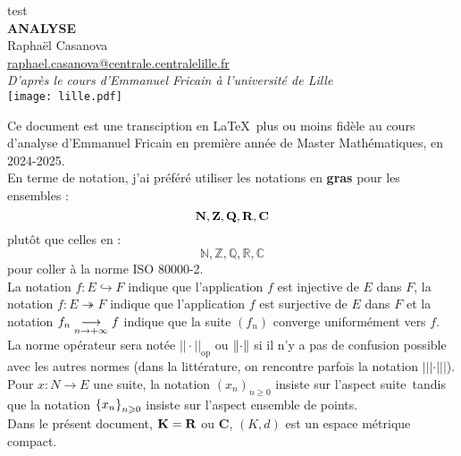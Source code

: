 \documentclass[a4paper,11pt, twoside]{article}
\title{}
\author{Raphaël Casanova}
\begin{document}
\pagestyle{empty}
\begin{center}
{\color{white} test}\\
\vspace{5cm}
{\bf \Huge {\YUGE A}NALYSE}\\[1em]
{\large
Raphaël Casanova\\
\href{mailto:raphael.casanova@centrale.centralelille.fr}{raphael.casanova@centrale.centralelille.fr}\\[2em]
\emph{D'après le cours d'Emmanuel Fricain à l'université de Lille}}\\
\vspace{10cm}
\texttt{[image: lille.pdf]}
\end{center}


\newpage


\pagestyle{pageGarde}


\tableofcontents


\newpage


Ce document est une transciption en \LaTeX\ plus ou moins fidèle au cours d'analyse d'Emmanuel Fricain en première année de Master Mathématiques, en 2024-2025.\\[3em]

En terme de notation, j'ai préféré utiliser les notations en {\bf gras} pour les ensembles : 
$$\mathbf N,\mathbf Z,\mathbf Q,\mathbf R,\mathbf C$$ plutôt que celles en : $$\mathbb N,\mathbb Z, \mathbb Q,\mathbb R,\mathbb C$$ pour coller à la norme ISO 80000-2.\\

La notation $f:E\hookrightarrow F$ indique que l'application $f$ est injective de $E$ dans $F$, la notation $f:E\twoheadrightarrow F$ indique que l'application $f$ est surjective de $E$ dans $F$ et la notation $f_n\underset{n\to+\infty}{\longrightarrow} f$ indique que la suite $(f_n)$ converge uniformément vers $f$.\\ 
La norme opérateur sera notée $||\cdot||_{\mathrm{op}}$ ou $\left\lVert\cdot\right\rVert$ si il n'y a pas de confusion possible avec les autres normes (dans la littérature, on rencontre parfois la notation $|||\cdot|||$).\\

Pour $x:N\longrightarrow E$ une suite, la notation $(x_n)_{n\geqslant 0}$ insiste sur l'aspect \og suite\fg\ tandis que la notation $\left\{x_n\right\}_{n\geqslant 0}$ insiste sur l'aspect \og ensemble de points\fg.\\

Dans le présent document, $\mathbf K=\mathbf R$ ou $\mathbf C$, $(K,d)$ est un espace métrique compact.\\
\end{document}
